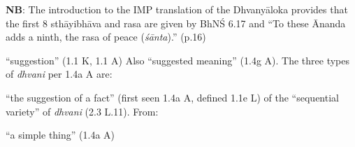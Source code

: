 \documentclass[10pt]{article}
\begin{document}
\begin{multicols}{2}
	\vspace{1mm}
	\textbf{NB}: The introduction to the IMP translation of the Dhvanyāloka provides that the first 8 sthāyibhāva and rasa are given by BhNŚ 6.17 and ``To these Ānanda adds a ninth, the rasa of peace (\textit{śānta}).'' (p.16)


	\begin{enumerate}[
			leftmargin=0em,
			rightmargin=0em,
		]
		\setlength{\itemsep}{0.15em}

		 ``suggestion'' (1.1 K, 1.1 A) Also ``suggested meaning'' (1.4g A). The three types of \textit{dhvani} per 1.4a A are:
		\begin{enumerate}

			 ``the suggestion of a fact'' (first seen 1.4a A, defined 1.1e L) of the ``sequential variety'' of \textit{dhvani} (2.3 L.11).
			From:
			\begin{itemize}
				 ``a simple thing'' (1.4a A)
			\end{itemize}


\end{enumerate}
\end{enumerate}
\end{multicols}
\end{document}
